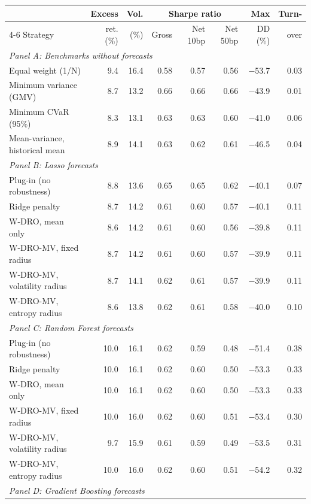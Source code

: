 \begin{tabular}{lrrrrrrr}
\toprule
 & Excess & Vol. & \multicolumn{3}{c}{Sharpe ratio} & Max & Turn- \\
\cmidrule(lr){4-6}
Strategy & ret. (\%) & (\%) & Gross & Net 10bp & Net 50bp & DD (\%) & over \\
\midrule
\multicolumn{8}{l}{\textit{Panel A: Benchmarks without forecasts}} \\
Equal weight (1/N) & 9.4 & 16.4 & 0.58 & 0.57 & 0.56 & $-$53.7 & 0.03 \\
Minimum variance (GMV) & 8.7 & 13.2 & 0.66 & 0.66 & 0.66 & $-$43.9 & 0.01 \\
Minimum CVaR (95\%) & 8.3 & 13.1 & 0.63 & 0.63 & 0.60 & $-$41.0 & 0.06 \\
Mean-variance, historical mean & 8.9 & 14.1 & 0.63 & 0.62 & 0.61 & $-$46.5 & 0.04 \\
\midrule
\multicolumn{8}{l}{\textit{Panel B: Lasso forecasts}} \\
Plug-in (no robustness) & 8.8 & 13.6 & 0.65 & 0.65 & 0.62 & $-$40.1 & 0.07 \\
Ridge penalty & 8.7 & 14.2 & 0.61 & 0.60 & 0.57 & $-$40.1 & 0.11 \\
W-DRO, mean only & 8.6 & 14.2 & 0.61 & 0.60 & 0.56 & $-$39.8 & 0.11 \\
W-DRO-MV, fixed radius & 8.7 & 14.2 & 0.61 & 0.60 & 0.57 & $-$39.9 & 0.11 \\
W-DRO-MV, volatility radius & 8.7 & 14.1 & 0.62 & 0.61 & 0.57 & $-$39.9 & 0.11 \\
W-DRO-MV, entropy radius & 8.6 & 13.8 & 0.62 & 0.61 & 0.58 & $-$40.0 & 0.10 \\
\midrule
\multicolumn{8}{l}{\textit{Panel C: Random Forest forecasts}} \\
Plug-in (no robustness) & 10.0 & 16.1 & 0.62 & 0.59 & 0.48 & $-$51.4 & 0.38 \\
Ridge penalty & 10.0 & 16.1 & 0.62 & 0.60 & 0.50 & $-$53.3 & 0.33 \\
W-DRO, mean only & 10.0 & 16.1 & 0.62 & 0.60 & 0.50 & $-$53.3 & 0.33 \\
W-DRO-MV, fixed radius & 10.0 & 16.0 & 0.62 & 0.60 & 0.51 & $-$53.4 & 0.30 \\
W-DRO-MV, volatility radius & 9.7 & 15.9 & 0.61 & 0.59 & 0.49 & $-$53.5 & 0.31 \\
W-DRO-MV, entropy radius & 10.0 & 16.0 & 0.62 & 0.60 & 0.51 & $-$54.2 & 0.32 \\
\midrule
\multicolumn{8}{l}{\textit{Panel D: Gradient Boosting forecasts}} \\

\end{tabular}
